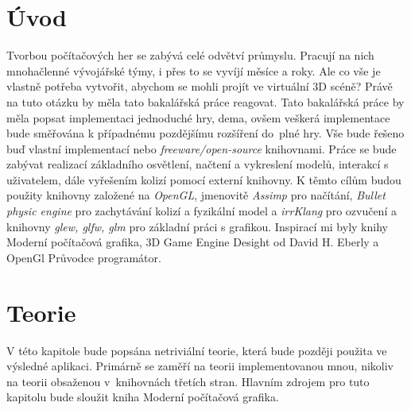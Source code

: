 
\chapter{Úvod}
Tvorbou počítačových her se zabývá celé odvětví průmyslu. Pracují na nich mnohačlenné vývojářské týmy, i přes to se vyvíjí měsíce a roky. Ale co vše je vlastně  potřeba vytvořit, abychom se mohli projít ve virtuální 3D scéně? Právě na tuto otázku by měla tato bakalářská práce reagovat. Tato bakalářská práce by měla popsat implementaci jednoduché hry, dema, ovšem veškerá implementace bude směřována k případnému pozdějšímu rozšíření do~plné hry. Vše bude řešeno buď vlastní implementací nebo \emph{freeware/open-source} knihovnami.
Práce se bude zabývat realizací základního osvětlení, načtení a vykreslení modelů, interakcí s uživatelem, dále vyřešením kolizí pomocí externí knihovny. K těmto cílům budou použity knihovny založené na \emph{OpenGL}, jmenovitě \emph{Assimp}\cite{assimp} pro načítání, \emph{Bullet physic engine}\cite{bullet} pro zachytávání kolizí a fyzikální model a \emph{irrKlang}\cite{irrKlang} pro ozvučení a knihovny \emph{glew\cite{glew}, glfw\cite{glfw}, glm\cite{glm}} pro základní práci s grafikou. Inspirací mi byly knihy Moderní počítačová grafika\cite{MPGBook}, 3D Game Engine Desight od David H. Eberly\cite{gengine} a OpenGl Průvodce programátor\cite{OpenGLBookcz}.          

\chapter{Teorie}
V této kapitole bude popsána netriviální teorie, která bude později použita ve výsledné aplikaci. Primárně se zaměří na teorii implementovanou mnou, nikoliv na teorii obsaženou v~knihovnách třetích stran. Hlavním zdrojem pro tuto kapitolu bude sloužit kniha Moderní počítačová grafika\cite{MPGBook}. 
